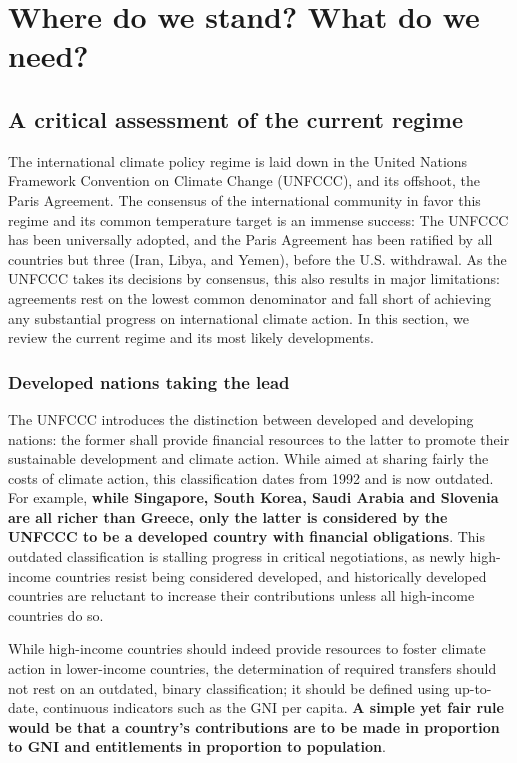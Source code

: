 \documentclass[12pt,english]{article}
\begin{document}

\clearpage

\section{Where do we stand? What do we need?\label{sec:now}}%


\subsection{A critical assessment of the current regime\label{subsec:criticism}}

The international climate policy regime is laid down in the United Nations Framework Convention on Climate Change (UNFCCC), and its offshoot, the Paris Agreement. The consensus of the international community in favor this regime and its common  temperature target is an immense success: The UNFCCC has been universally adopted, and the Paris Agreement has been ratified by all countries but three (Iran, Libya, and Yemen), before the U.S. withdrawal. As the UNFCCC takes its decisions by consensus, this also results in major limitations: agreements rest on the lowest common denominator and fall short of achieving any substantial progress on international climate action. In this section, we review the current regime and its most likely developments.

\subsubsection{Developed nations taking the lead\label{subsubsec:developed}}
The UNFCCC introduces the distinction between developed and developing nations: the former shall provide financial resources to the latter to promote their sustainable development and climate action. While aimed at sharing fairly the costs of climate action, this classification dates from 1992 and is now outdated. For example, \textbf{while Singapore, South Korea, Saudi Arabia and Slovenia are all richer than Greece, only the latter is considered by the UNFCCC to be a developed country with financial obligations}. This outdated classification is stalling progress in critical negotiations, as newly high-income countries resist being considered developed, and historically developed countries are reluctant to increase their contributions unless all high-income countries do so.

While high-income countries should indeed provide resources to foster climate action in lower-income countries, the determination of required transfers should not rest on an outdated, binary classification; it should be defined using up-to-date, continuous indicators such as the GNI per capita. \textbf{A simple yet fair rule would be that a country's contributions are to be made in proportion to GNI and entitlements in proportion to population}. 
\end{document}
